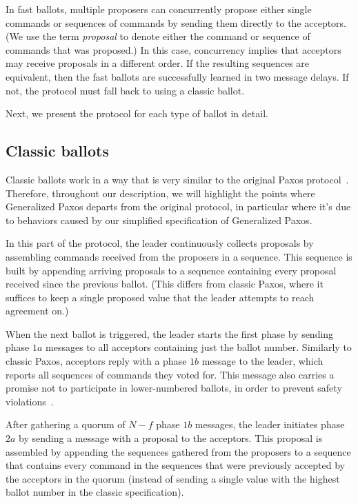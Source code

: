 In fast ballots, multiple proposers can concurrently propose either single commands or sequences of commands by sending them directly to the acceptors. (We use the term \textit{proposal} to denote either the command or sequence of commands that was proposed.)
In this case, concurrency implies that acceptors may receive proposals in a different order. If the resulting sequences are equivalent, then the fast ballots are successfully learned in two message delays. If not, the protocol must fall back to using a classic ballot.

Next, we present the protocol for each type of ballot in detail.

\subsection{Classic ballots} 

Classic ballots work in a way that is very similar to the original Paxos protocol~\cite{Lam98}. Therefore, throughout our description, we will highlight the points where Generalized Paxos departs from the original protocol, in particular where it's due to behaviors caused by our simplified specification of Generalized Paxos.

In this part of the protocol, the leader continuously collects proposals by assembling commands received from the proposers in a sequence. This sequence is built by appending arriving proposals to a sequence containing every proposal received since the previous ballot. (This differs from classic Paxos, where it suffices to keep a single proposed value that the leader attempts to reach agreement on.)

When the next ballot is triggered, the leader starts the first phase by sending phase $1a$ messages to all acceptors containing just the ballot number. Similarly to classic Paxos, acceptors reply with a phase $1b$ message to the leader, which reports all sequences of commands they voted for. This message also carries a promise not to participate in lower-numbered ballots, in order to prevent safety violations~\cite{Lam98}.

After gathering a quorum of $N-f$ phase $1b$ messages, the leader initiates phase $2a$ by sending a message with a proposal to the acceptors. This proposal is assembled by appending the sequences gathered from the proposers to a sequence that contains every command in the sequences that were previously accepted by the acceptors in the quorum (instead of sending a single value with the highest ballot number in the classic specification).

